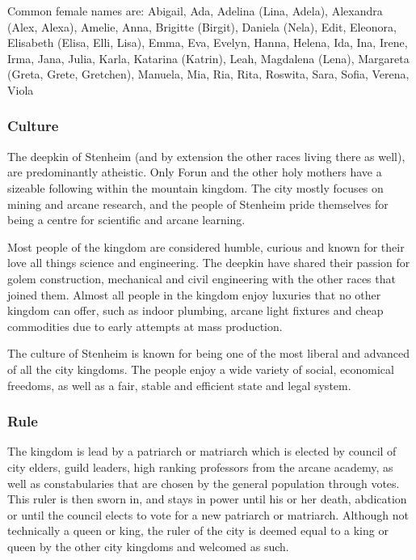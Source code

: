 Common female names are: Abigail, Ada, Adelina (Lina, Adela), Alexandra (Alex,
Alexa), Amelie, Anna, Brigitte (Birgit), Daniela (Nela), Edit, Eleonora,
Elisabeth (Elisa, Elli, Lisa), Emma, Eva, Evelyn, Hanna, Helena, Ida, Ina,
Irene, Irma, Jana, Julia, Karla, Katarina (Katrin), Leah, Magdalena (Lena),
Margareta (Greta, Grete, Gretchen), Manuela, Mia, Ria, Rita, Roswita, Sara,
Sofia, Verena, Viola

\subsubsection{Culture}

The deepkin of Stenheim (and by extension the other races living there as
well), are predominantly atheistic. Only Forun and the other holy mothers have
a sizeable following within the mountain kingdom. The city mostly focuses on
mining and arcane research, and the people of Stenheim pride themselves for
being a centre for scientific and arcane learning.

Most people of the kingdom are considered humble, curious and known for their
love all things science and engineering. The deepkin have shared their passion
for golem construction, mechanical and civil engineering with the other races
that joined them. Almost all people in the kingdom enjoy luxuries that no
other kingdom can offer, such as indoor plumbing, arcane light fixtures and
cheap commodities due to early attempts at mass production.

The culture of Stenheim is known for being one of the most liberal and
advanced of all the city kingdoms. The people enjoy a wide variety of social,
economical freedoms, as well as a fair, stable and efficient state and legal
system.

\subsubsection{Rule}

The kingdom is lead by a patriarch or matriarch which is elected by council of
city elders, guild leaders, high ranking professors from the arcane academy,
as well as constabularies that are chosen by the general population through
votes. This ruler is then sworn in, and stays in power until his or her death,
abdication or until the council elects to vote for a new patriarch or
matriarch. Although not technically a queen or king, the ruler of the city is
deemed equal to a king or queen by the other city kingdoms and welcomed as
such.

